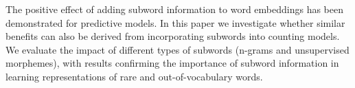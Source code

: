 The positive effect of adding subword information to word embeddings has been demonstrated for predictive models. In this paper we investigate whether similar benefits can also be derived from incorporating subwords into counting models. We  evaluate the impact of different types of subwords (n-grams and unsupervised morphemes), with results confirming the importance of subword information in learning representations of rare and out-of-vocabulary words.
